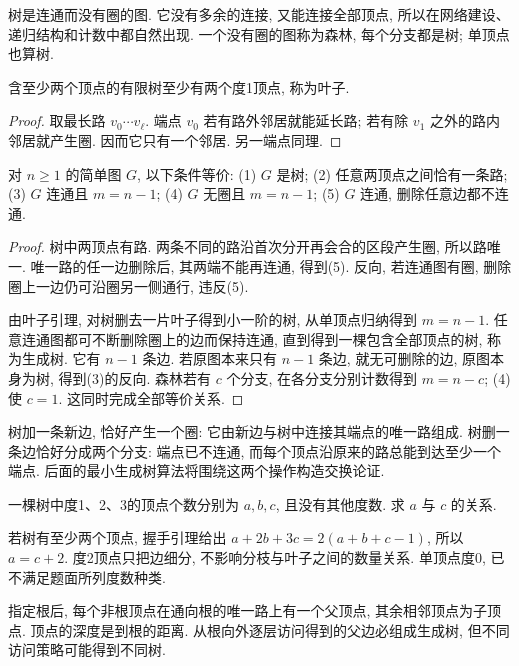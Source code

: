 \label{ch:trees}
树是连通而没有圈的图. 它没有多余的连接, 又能连接全部顶点, 所以在网络建设、递归结构和计数中都自然出现. 一个没有圈的图称为森林, 每个分支都是树; 单顶点也算树.
\begin{lemma}\label{lem:leaf}
含至少两个顶点的有限树至少有两个度1顶点, 称为叶子.
\end{lemma}
\begin{proof}
取最长路 $v_0\cdots v_\ell$. 端点 $v_0$ 若有路外邻居就能延长路; 若有除 $v_1$ 之外的路内邻居就产生圈. 因而它只有一个邻居. 另一端点同理.
\end{proof}
\begin{theorem}\label{thm:tree-equivalent}
对 $n\ge1$ 的简单图 $G$, 以下条件等价: (1) $G$ 是树; (2) 任意两顶点之间恰有一条路; (3) $G$ 连通且 $m=n-1$; (4) $G$ 无圈且 $m=n-1$; (5) $G$ 连通, 删除任意边都不连通.
\end{theorem}
\begin{proof}
树中两顶点有路. 两条不同的路沿首次分开再会合的区段产生圈, 所以路唯一. 唯一路的任一边删除后, 其两端不能再连通, 得到(5). 反向, 若连通图有圈, 删除圈上一边仍可沿圈另一侧通行, 违反(5).

由叶子引理, 对树删去一片叶子得到小一阶的树, 从单顶点归纳得到 $m=n-1$. 任意连通图都可不断删除圈上的边而保持连通, 直到得到一棵包含全部顶点的树, 称为生成树. 它有 $n-1$ 条边. 若原图本来只有 $n-1$ 条边, 就无可删除的边, 原图本身为树, 得到(3)的反向. 森林若有 $c$ 个分支, 在各分支分别计数得到 $m=n-c$; (4)使 $c=1$. 这同时完成全部等价关系.
\end{proof}
树加一条新边, 恰好产生一个圈: 它由新边与树中连接其端点的唯一路组成. 树删一条边恰好分成两个分支: 端点已不连通, 而每个顶点沿原来的路总能到达至少一个端点. 后面的最小生成树算法将围绕这两个操作构造交换论证.
\begin{example}
一棵树中度1、2、3的顶点个数分别为 $a,b,c$, 且没有其他度数. 求 $a$ 与 $c$ 的关系.
\end{example}
\begin{solution}
若树有至少两个顶点, 握手引理给出 $a+2b+3c=2(a+b+c-1)$, 所以 $a=c+2$. 度2顶点只把边细分, 不影响分枝与叶子之间的数量关系. 单顶点度0, 已不满足题面所列度数种类.
\end{solution}
指定根后, 每个非根顶点在通向根的唯一路上有一个父顶点, 其余相邻顶点为子顶点. 顶点的深度是到根的距离. 从根向外逐层访问得到的父边必组成生成树, 但不同访问策略可能得到不同树.

